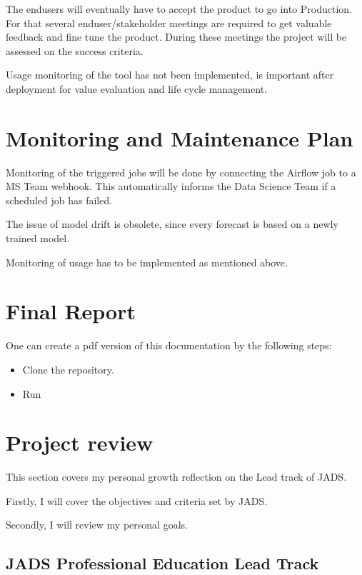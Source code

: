 \documentclass[letterpaper,10pt,english]{sphinxmanual}
\begin{document}
The end\sphinxhyphen{}users will eventually have to accept the product to go into Production.
For that several end\sphinxhyphen{}user/stakeholder meetings are required to get valuable feedback and fine tune the product.
During these meetings the project will be assessed on the success criteria.

Usage monitoring of the tool has not been implemented, is important after deployment for value evaluation and life cycle management.


\section{Monitoring and Maintenance Plan}
\label{\detokenize{deployment:monitoring-and-maintenance-plan}}
Monitoring of the triggered jobs will be done by connecting the Airflow job to a MS Team webhook.
This automatically informs the Data Science Team if a scheduled job has failed.

The issue of model drift is obsolete, since every forecast is based on a newly trained model.

Monitoring of usage has to be implemented as mentioned above.


\section{Final Report}
\label{\detokenize{deployment:final-report}}
One can create a pdf version of this documentation by the following steps:
\begin{itemize}
\item {} 
Clone the repository.

\item {} 
Run 

\end{itemize}


\section{Project review}
\label{\detokenize{deployment:project-review}}
This section covers my personal growth reflection on the Lead track of JADS.

Firstly, I will cover the objectives and criteria set by JADS.

Secondly, I will review my personal goals.


\subsection{JADS \sphinxhyphen{} Professional Education \sphinxhyphen{} Lead Track}
\label{\detokenize{deployment:jads-professional-education-lead-track}}
\end{document}
